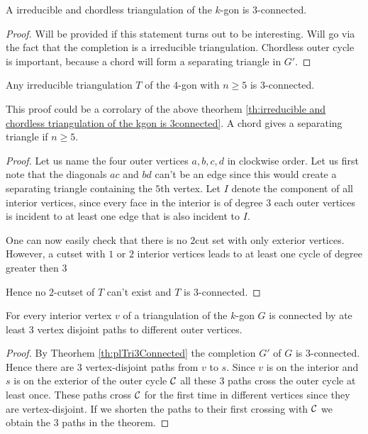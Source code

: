 \begin{thrm}
\label{th:irreducible and chordless triangulation of the kgon is 3connected}
A irreducible and chordless triangulation of the $k$-gon is $3$-connected.
\end{thrm}
\begin{proof}
\note Will be provided if this statement turns out to be interesting. Will go via the fact that the completion is a irreducible triangulation. Chordless outer cycle is important, because a chord will form a separating triangle in $G'$.
\end{proof}

\begin{thrm}
Any irreducible triangulation $T$ of the $4$-gon with $n \geq 5$ is $3$-connected. 
\end{thrm}

\note This proof could be a corrolary of the above theorhem \ref{th:irreducible and chordless triangulation of the kgon is 3connected}. A chord gives a separating triangle if $n\geq 5$.
\begin{proof} 
Let us name the four outer vertices $a,b,c,d$ in clockwise order. Let us first note that the diagonals $ac$ and $bd$ can't be an edge since this would create a separating triangle containing the $5$th vertex. Let $I$ denote the component of all interior vertices, since every face in the interior is of degree $3$ each outer vertices is incident to at least one edge that is also incident to $I$. %

One can now easily check that there is no $2$cut set with only exterior vertices. However, a cutset with $1$ or $2$ interior vertices leads to at least one cycle of degree greater then $3$ %

Hence no $2$-cutset of $T$ can't exist and $T$ is $3$-connected. 
\end{proof}

\begin{thrm}
For every interior vertex $v$ of a triangulation of the $k$-gon $G$ is connected by ate least $3$ vertex disjoint paths to different outer vertices.
\end{thrm}
\begin{proof}
By Theorhem \ref{th:plTri3Connected} the completion $G'$ of $G$ is $3$-connected. Hence there are 3 vertex-disjoint paths from $v$ to $s$. Since $v$ is on the interior and $s$ is on the exterior of the outer cycle $\mathcal{C}$ all these 3 paths cross the outer cycle at least once. These paths cross $\mathcal{C}$ for the first time in different vertices since they are vertex-disjoint. If we shorten the paths to their first crossing with $\mathcal{C}$ we obtain the $3$ paths in the theorem.
\end{proof}

